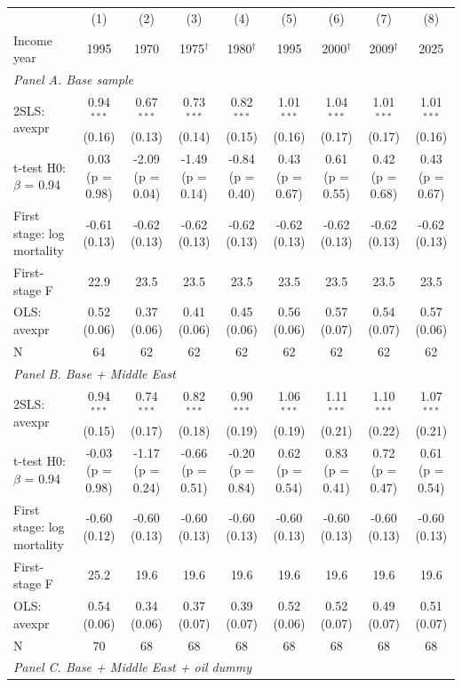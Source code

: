 \begin{tabular}{lcccccccc}
\toprule
 & (1) & (2) & (3) & (4) & (5) & (6) & (7) & (8) \\
Income year & 1995 & 1970 & 1975$^\dagger$ & 1980$^\dagger$ & 1995 & 2000$^\dagger$ & 2009$^\dagger$ & 2025 \\
\midrule
\multicolumn{9}{l}{\textit{Panel A. Base sample}} \\
2SLS: avexpr & 0.94$^{***}$ (0.16) & 0.67$^{***}$ (0.13) & 0.73$^{***}$ (0.14) & 0.82$^{***}$ (0.15) & 1.01$^{***}$ (0.16) & 1.04$^{***}$ (0.17) & 1.01$^{***}$ (0.17) & 1.01$^{***}$ (0.16) \\
t-test H0: $\beta$ = 0.94 & 0.03 (p = 0.98) & -2.09 (p = 0.04) & -1.49 (p = 0.14) & -0.84 (p = 0.40) & 0.43 (p = 0.67) & 0.61 (p = 0.55) & 0.42 (p = 0.68) & 0.43 (p = 0.67) \\
First stage: log mortality & -0.61 (0.13) & -0.62 (0.13) & -0.62 (0.13) & -0.62 (0.13) & -0.62 (0.13) & -0.62 (0.13) & -0.62 (0.13) & -0.62 (0.13) \\
First-stage F & 22.9 & 23.5 & 23.5 & 23.5 & 23.5 & 23.5 & 23.5 & 23.5 \\
OLS: avexpr & 0.52 (0.06) & 0.37 (0.06) & 0.41 (0.06) & 0.45 (0.06) & 0.56 (0.06) & 0.57 (0.07) & 0.54 (0.07) & 0.57 (0.06) \\
N & 64 & 62 & 62 & 62 & 62 & 62 & 62 & 62 \\
\midrule
\multicolumn{9}{l}{\textit{Panel B. Base + Middle East}} \\
2SLS: avexpr & 0.94$^{***}$ (0.15) & 0.74$^{***}$ (0.17) & 0.82$^{***}$ (0.18) & 0.90$^{***}$ (0.19) & 1.06$^{***}$ (0.19) & 1.11$^{***}$ (0.21) & 1.10$^{***}$ (0.22) & 1.07$^{***}$ (0.21) \\
t-test H0: $\beta$ = 0.94 & -0.03 (p = 0.98) & -1.17 (p = 0.24) & -0.66 (p = 0.51) & -0.20 (p = 0.84) & 0.62 (p = 0.54) & 0.83 (p = 0.41) & 0.72 (p = 0.47) & 0.61 (p = 0.54) \\
First stage: log mortality & -0.60 (0.12) & -0.60 (0.13) & -0.60 (0.13) & -0.60 (0.13) & -0.60 (0.13) & -0.60 (0.13) & -0.60 (0.13) & -0.60 (0.13) \\
First-stage F & 25.2 & 19.6 & 19.6 & 19.6 & 19.6 & 19.6 & 19.6 & 19.6 \\
OLS: avexpr & 0.54 (0.06) & 0.34 (0.06) & 0.37 (0.07) & 0.39 (0.07) & 0.52 (0.06) & 0.52 (0.07) & 0.49 (0.07) & 0.51 (0.07) \\
N & 70 & 68 & 68 & 68 & 68 & 68 & 68 & 68 \\
\midrule
\multicolumn{9}{l}{\textit{Panel C. Base + Middle East + oil dummy}} \\

\end{tabular}
